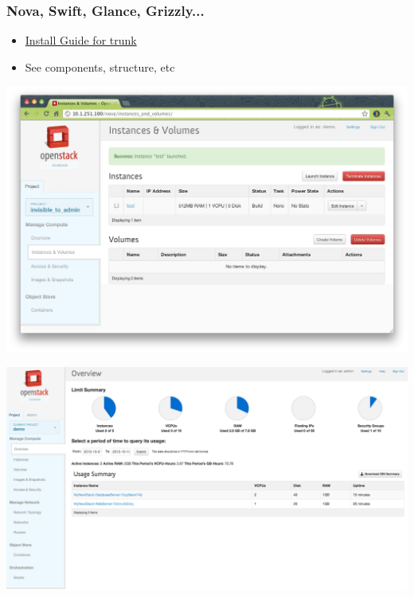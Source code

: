 \begin{frame}
\frametitle{Nova, Swift, Glance, Grizzly...}

\begin{itemize}
\item \href{http://docs.openstack.org/trunk/install-guide/install/apt/content/ch\_overview.html}{Install Guide for trunk}
\item See components, structure, etc
\end{itemize}

\end{frame}

\begin{frame}
\begin{center}
     \includegraphics[width=\textwidth]{images/horizon.jpg}
\end{center}
\end{frame}

\begin{frame}
\begin{center}
     \includegraphics[width=\textwidth]{images/interfaceimprovements.png}
\end{center}
\end{frame}

